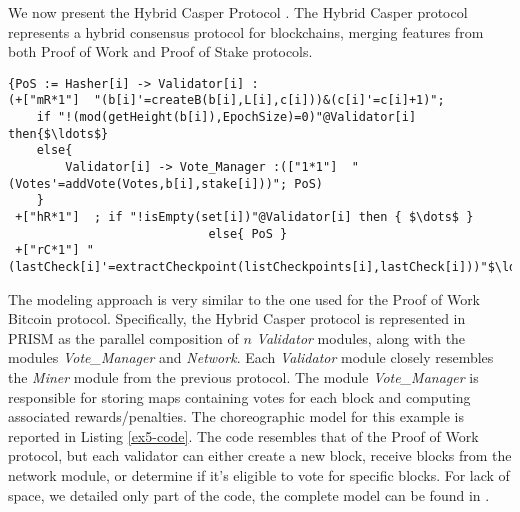 \begin{comment}
\begin{wrapfigure}[12]{l}{4.5cm}
	\texttt{[image: ethereum.pdf]}	
\end{wrapfigure} 
\end{comment}
We now present the Hybrid Casper Protocol \cite{DBLP:journals/distribledger/GallettaLMV23}. The Hybrid Casper protocol represents a hybrid consensus protocol for blockchains, merging features from both Proof of Work and Proof of Stake protocols. 
\begin{lstlisting}[style=chor-color,tabsize=2,breaklines=true, postbreak=\mbox{\textcolor{red}{$\hookrightarrow$}\space},	caption={Excerpt of the Hybrid Casper Protocol as a choreography},captionpos=b,label={ex5-code}]
{PoS := Hasher[i] -> Validator[i] :
(+["mR*1"]  "(b[i]'=createB(b[i],L[i],c[i]))&(c[i]'=c[i]+1)"; 
	if "!(mod(getHeight(b[i]),EpochSize)=0)"@Validator[i] then{$\ldots$}
	else{
		Validator[i] -> Vote_Manager :(["1*1"]  "(Votes'=addVote(Votes,b[i],stake[i]))"; PoS)
	}
 +["hR*1"]  ; if "!isEmpty(set[i])"@Validator[i] then { $\dots$ }
 							else{ PoS }
 +["rC*1"] "(lastCheck[i]'=extractCheckpoint(listCheckpoints[i],lastCheck[i]))"$\ldots$}

\end{lstlisting}
The modeling approach is very similar to the one used for the Proof of Work Bitcoin protocol. Specifically, the Hybrid Casper protocol is represented in PRISM as the parallel composition of $n$ \emph{Validator} modules, along with the modules \emph{Vote\_Manager} and \emph{Network}. Each \emph{Validator} module closely resembles the \emph{Miner} module from the previous protocol. The module \emph{Vote\_Manager} is responsible for storing maps containing votes for each block and computing associated rewards/penalties.
The choreographic model for this example is reported in Listing \ref{ex5-code}. 
The code resembles that of the Proof of Work protocol, but each validator can either create a new block, receive blocks from the network module, or determine if it's eligible to vote for specific blocks.
For lack of space, we detailed only part of the code, the complete model can be found in \cite{repository}.

